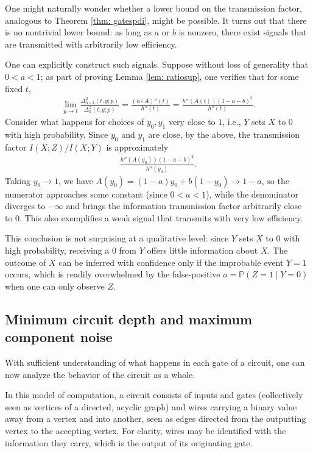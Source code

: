 \documentclass[12pt,reqno]{amsart}
\theoremstyle{plain} %
\theoremstyle{remark}
\theoremstyle{definition}
\renewcommand{\P}{\mathbb P}
\begin{document}
One might naturally wonder whether a lower bound on the transmission factor, analogous to Theorem \ref{thm: gatespdi}, might be possible. It turns out that there is no nontrivial lower bound: as long as $a$ or $b$ is nonzero, there exist signals that are transmitted with arbitrarily low efficiency.

One can explicitly construct such signals. Suppose without loss of generality that $0<a<1$; as part of proving Lemma \ref{lem: ratiosup}, one verifies that for some fixed $t$,
\begin{align}
    \lim_{y\to t}\frac{\Delta^2_{h\circ A}(t,y;p)}{\Delta^2_h(t,y;p)}=\frac{(h\circ A)''(t)}{h''(t)}=\frac{h''(A(t))(1-a-b)^2}{h''(t)}.
\end{align}
Consider what happens for choices of $y_0, y_1$ very close to $1$, i.e., $Y$ sets $X$ to $0$ with high probability. Since $y_0$ and $y_1$ are close, by the above, the transmission factor $I(X;Z)/I(X;Y)$ is approximately
\begin{align}
    \frac{h''(A(y_0))(1-a-b)^2}{h''(y_0)}.
\end{align}
Taking $y_0\to 1$, we have $A(y_0)=(1-a)y_0+b(1-y_0)\to 1-a$, so the numerator approaches some constant (since $0<a<1$), while the denominator diverges to $-\infty$ and brings the information transmission factor arbitrarily close to $0$. This also exemplifies a weak signal that transmits with very low efficiency.

This conclusion is not surprising at a qualitative level: since $Y$ sets $X$ to $0$ with high probability, receiving a $0$ from $Y$ offers little information about $X$. The outcome of $X$ can be inferred with confidence only if the improbable event $Y=1$ occurs, which is readily overwhelmed by the false-positive $a=\P(Z=1\mid Y=0)$ when one can only observe $Z$.


\subsection{Minimum circuit depth and maximum component noise}

With sufficient understanding of what happens in each gate of a circuit, one can now analyze the behavior of the circuit as a whole. 

In this model of computation, a circuit consists of inputs and gates (collectively seen as vertices of a directed, acyclic graph) and wires carrying a binary value away from a vertex and into another, seen as edges directed from the outputting vertex to the accepting vertex. For clarity, wires may be identified with the information they carry, which is the output of its originating gate.
\end{document}
